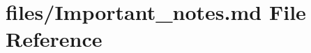 \hypertarget{Important__notes_8md}{}\section{files/\+Important\+\_\+notes.md File Reference}
\label{Important__notes_8md}
